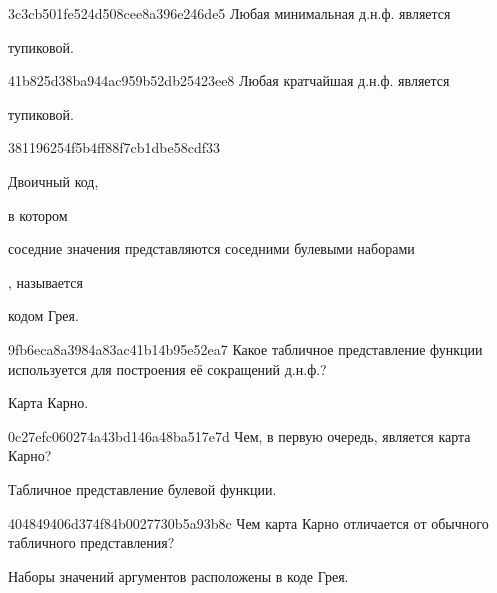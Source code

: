 \begin{note}{3c3cb501fe524d508cee8a396e246de5}
    Любая минимальная д.н.ф. является \begin{icloze}{1}тупиковой.\end{icloze}
\end{note}

\begin{note}{41b825d38ba944ac959b52db25423ee8}
    Любая кратчайшая д.н.ф. является \begin{icloze}{1}тупиковой.\end{icloze}
\end{note}

\begin{note}{381196254f5b4ff88f7cb1dbe58cdf33}
    \begin{icloze}{1}Двоичный код,\end{icloze} в котором \begin{icloze}{2}соседние значения представляются соседними булевыми наборами\end{icloze}, называется \begin{icloze}{3}кодом Грея.\end{icloze}
\end{note}

\begin{note}{9fb6eca8a3984a83ac41b14b95e52ea7}
    Какое табличное представление функции используется для построения её сокращений д.н.ф.?

    \begin{cloze}{1}
        Карта Карно.
    \end{cloze}
\end{note}

\begin{note}{0c27efc060274a43bd146a48ba517e7d}
    Чем, в первую очередь, является карта Карно?

    \begin{cloze}{1}
        Табличное представление булевой функции.
    \end{cloze}
\end{note}

\begin{note}{404849406d374f84b0027730b5a93b8c}
    Чем карта Карно отличается от обычного табличного представления?

    \begin{cloze}{1}
        Наборы значений аргументов расположены в коде Грея.
    \end{cloze}
\end{note}


